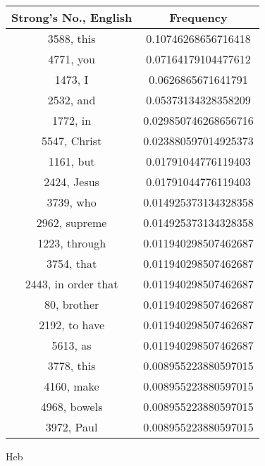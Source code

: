 \documentclass[12pt,letterpaper]{article}
\begin{document}
 \begin{longtable}{|c|c|}
\hline
 Strong's No., English & Frequency \\ \hline  
3588, this & 0.10746268656716418\\ \hline 
 4771, you & 0.07164179104477612\\ \hline 
 1473, I & 0.0626865671641791\\ \hline 
 2532, and & 0.05373134328358209\\ \hline 
 1772, in & 0.029850746268656716\\ \hline 
 5547, Christ & 0.023880597014925373\\ \hline 
 1161, but & 0.01791044776119403\\ \hline 
 2424, Jesus & 0.01791044776119403\\ \hline 
 3739, who & 0.014925373134328358\\ \hline 
 2962, supreme & 0.014925373134328358\\ \hline 
 1223, through & 0.011940298507462687\\ \hline 
 3754, that & 0.011940298507462687\\ \hline 
 2443, in order that & 0.011940298507462687\\ \hline 
 80, brother & 0.011940298507462687\\ \hline 
 2192, to have & 0.011940298507462687\\ \hline 
 5613, as & 0.011940298507462687\\ \hline 
 3778, this & 0.008955223880597015\\ \hline 
 4160, make & 0.008955223880597015\\ \hline 
 4968, bowels & 0.008955223880597015\\ \hline 
 3972, Paul & 0.008955223880597015\\ \hline 
\end{longtable} 
 

Heb
\end{document}
